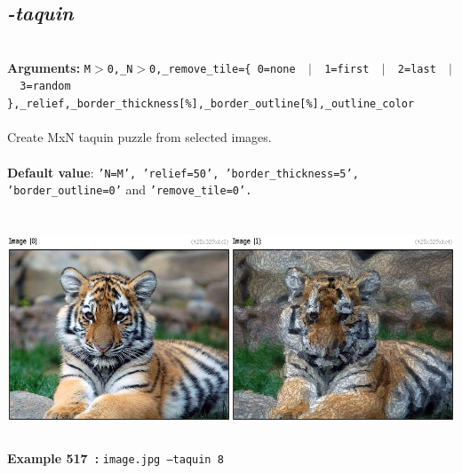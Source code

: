\documentclass[a4paper,11pt,twoside]{book}
\begin{document}
\subsection{\emph{-taquin} }\vspace*{-0.5em}
~\\\textbf{Arguments: } 
{\small \texttt{M$>$0,\_N$>$0,\_remove\_tile=\{ 0=none ~$|$~ 1=first ~$|$~ 2=last ~$|$~ 3=random \},\_relief,\_border\_thickness[\%],\_border\_outline[\%],\_outline\_color}}\\~\\
Create MxN taquin puzzle from selected images.
~\\~\\\textbf{Default value}: {\small \texttt{'N=M', 'relief=50', 'border\_thickness=5', 'border\_outline=0'} and \texttt{'remove\_tile=0'.}}
\begin{center}\includegraphics[keepaspectratio=true,height=7cm,width=\textwidth]{img/gmic_def517.jpg}\\
{\footnotesize \textbf{Example 517~:} \texttt{image.jpg --taquin 8}}
\end{center}
\end{document}
